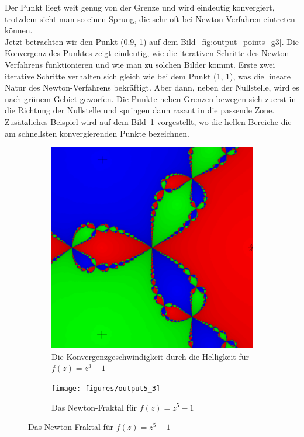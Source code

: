 \documentclass[a4paper,12pt]{llncs}
\makeatletter
\newcommand\nocaption{%
	\renewcommand\p@subfigure{}
	\renewcommand\thesubfigure{\thefigure\alph{subfigure}}
}
\numberwithin{equation}{section}
\makeatother
\begin{document}
Der Punkt liegt weit genug von der Grenze und wird eindeutig konvergiert, trotzdem sieht man so einen Sprung, die sehr oft bei Newton-Verfahren eintreten können.\\
Jetzt betrachten wir den Punkt (0.9, 1) auf dem Bild~\ref{fig:output_points_g3}.
Die Konvergenz des Punktes zeigt eindeutig, wie die iterativen Schritte des Newton-Verfahrens funktionieren und wie man zu solchen Bilder kommt. 
Erste zwei iterative Schritte verhalten sich gleich wie bei dem Punkt (1, 1), was die lineare Natur des Newton-Verfahrens bekräftigt. 
Aber dann, neben der Nullstelle, wird es nach grünem Gebiet geworfen.
Die Punkte neben Grenzen bewegen sich zuerst in die Richtung der Nullstelle und springen dann rasant in die passende Zone.\\
Zusätzliches Beispiel wird auf dem Bild~\ref{fig:output3_3} vorgestellt, wo die hellen Bereiche die am schnellsten konvergierenden Punkte bezeichnen.
\begin{figure}[ht]   
	\nocaption
	\begin{subfigure}{.5\textwidth}
	\centering
		\includegraphics[width=.8\linewidth]{figures/output3_3}
		\captionsetup{width=0.8\textwidth}
		\caption{Die Konvergenzgeschwindigkeit durch die Helligkeit für $f(z)=z^3-1$ }
		\label{fig:output3_3}
	\end{subfigure}%
	\begin{subfigure}{.5\textwidth}
	\centering
		\texttt{[image: figures/output5\_3]}
		\captionsetup{width=0.8\textwidth}
		\caption{Das Newton-Fraktal für $f(z)=z^5-1$ }
		\label{fig:output5_3}
	\end{subfigure}%
\end{figure}
\end{document}
